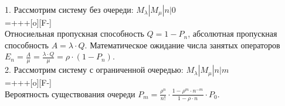 \documentclass{article}
\begin{document}
\\
1. Рассмотрим систему без очереди: \begin{math}M_{\lambda}|M_{\mu}|n|0\end{math}
\vspace{\baselineskip}
\\
\entrymodifiers={+++[o][F-]}
\vspace{\baselineskip}
\\
Относиельная пропускная способность \begin{math}Q = 1 - P_n\end{math}, абсолютная пропускная способность \begin{math}A = \lambda \cdot Q\end{math}. Математическое ожидание числа занятых операторов \begin{math}E_n = \displaystyle\frac{A}{\mu}=\displaystyle\frac{\lambda \cdot Q}{\mu} = \rho \cdot (1 - P_n)\end{math}.
\vspace{\baselineskip}
\\
2. Рассмотрим систему с ограниченной очередью:
\begin{math}M_{\lambda}|M_{\mu}|n|m\end{math}
\vspace{\baselineskip}
\\
\entrymodifiers={+++[o][F-]}
\vspace{\baselineskip}
\\
Вероятность существования очереди \begin{math}P_m  = \displaystyle\frac{\rho^n}{n!} \cdot \displaystyle\frac{1 - \rho^m \cdot n^{-m}}{1 - \rho \cdot n} \cdot P_0\end{math}.
\end{document}
